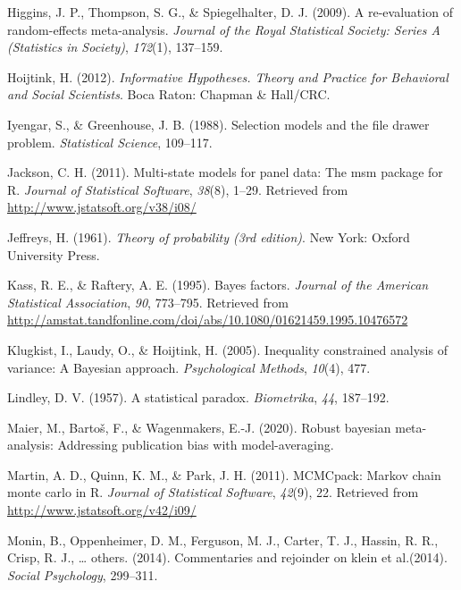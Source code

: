 \documentclass[english,,man]{apa6}
\begin{document}
\leavevmode\hypertarget{ref-Higgins:etal:2009}{}%
Higgins, J. P., Thompson, S. G., \& Spiegelhalter, D. J. (2009). A re-evaluation of random-effects meta-analysis. \emph{Journal of the Royal Statistical Society: Series A (Statistics in Society)}, \emph{172}(1), 137--159.

\leavevmode\hypertarget{ref-Hoijtink:2012}{}%
Hoijtink, H. (2012). \emph{Informative Hypotheses. Theory and Practice for Behavioral and Social Scientists}. Boca Raton: Chapman \& Hall/CRC.

\leavevmode\hypertarget{ref-Iyengar:Greenhouse:1988}{}%
Iyengar, S., \& Greenhouse, J. B. (1988). Selection models and the file drawer problem. \emph{Statistical Science}, 109--117.

\leavevmode\hypertarget{ref-R-msm}{}%
Jackson, C. H. (2011). Multi-state models for panel data: The msm package for R. \emph{Journal of Statistical Software}, \emph{38}(8), 1--29. Retrieved from \url{http://www.jstatsoft.org/v38/i08/}

\leavevmode\hypertarget{ref-Jeffreys:1961}{}%
Jeffreys, H. (1961). \emph{Theory of probability (3rd edition)}. New York: Oxford University Press.

\leavevmode\hypertarget{ref-Kass:Raftery:1995}{}%
Kass, R. E., \& Raftery, A. E. (1995). Bayes factors. \emph{Journal of the American Statistical Association}, \emph{90}, 773--795. Retrieved from \url{http://amstat.tandfonline.com/doi/abs/10.1080/01621459.1995.10476572}

\leavevmode\hypertarget{ref-Klugkist:etal:2005}{}%
Klugkist, I., Laudy, O., \& Hoijtink, H. (2005). Inequality constrained analysis of variance: A Bayesian approach. \emph{Psychological Methods}, \emph{10}(4), 477.

\leavevmode\hypertarget{ref-Lindley:1957}{}%
Lindley, D. V. (1957). A statistical paradox. \emph{Biometrika}, \emph{44}, 187--192.

\leavevmode\hypertarget{ref-Maier:etal:2020}{}%
Maier, M., Bartoš, F., \& Wagenmakers, E.-J. (2020). Robust bayesian meta-analysis: Addressing publication bias with model-averaging.

\leavevmode\hypertarget{ref-R-MCMCpack}{}%
Martin, A. D., Quinn, K. M., \& Park, J. H. (2011). MCMCpack: Markov chain monte carlo in R. \emph{Journal of Statistical Software}, \emph{42}(9), 22. Retrieved from \url{http://www.jstatsoft.org/v42/i09/}

\leavevmode\hypertarget{ref-Monin:etal:2014}{}%
Monin, B., Oppenheimer, D. M., Ferguson, M. J., Carter, T. J., Hassin, R. R., Crisp, R. J., \ldots{} others. (2014). Commentaries and rejoinder on klein et al.(2014). \emph{Social Psychology}, 299--311.
\end{document}
